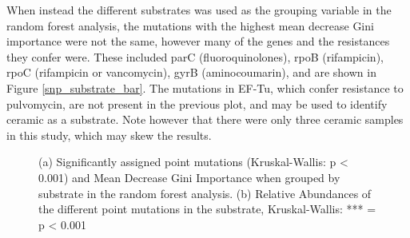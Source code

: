 When instead the different substrates was used as the grouping variable in the random forest analysis, the mutations with the highest mean decrease Gini importance were not the same, however many of the genes and the resistances they confer were. These included parC (fluoroquinolones), rpoB (rifampicin), rpoC (rifampicin or vancomycin), gyrB (aminocoumarin), and are shown in Figure \ref{snp_substrate_bar}. The mutations in EF-Tu, which confer resistance to pulvomycin, are not present in the previous plot, and may be used to identify ceramic as a substrate. Note however that there were only three ceramic samples in this study, which may skew the results.

\begin{figure}[h!]
    \centering
    \caption{(a) Significantly assigned point mutations (Kruskal-Wallis: p < 0.001) and Mean Decrease Gini Importance when grouped by substrate in the random forest analysis. (b) Relative Abundances of the different point mutations in the substrate, Kruskal-Wallis: *** = p < 0.001}
    \label{snps_substrate}
\end{figure}

